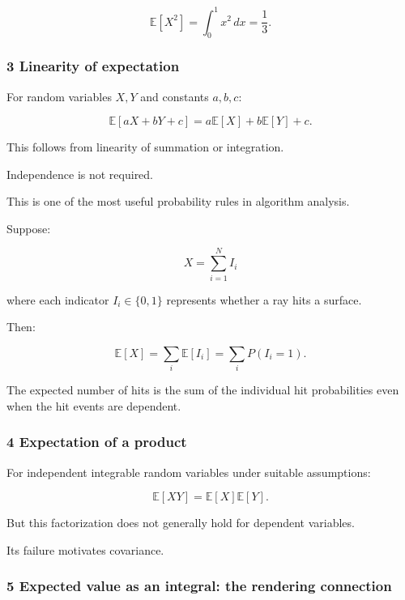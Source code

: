 \[
 \mathbb E[X^2] = \int_0^1x^2\,dx =\boxed{\frac13}.
\]

\subsubsection{3 Linearity of expectation}\label{02-foundations-ii-ch023-linearity-of-expectation}

\hypertarget{02-foundations-ii-ch023-linearity-of-expectation}{}

For random variables \(X,Y\) and constants \(a,b,c\):

\[
 \boxed{ \mathbb E[aX+bY+c] = a\mathbb E[X]+b\mathbb E[Y]+c }.
\]

This follows from linearity of summation or integration.

Independence is not required.

This is one of the most useful probability rules in algorithm analysis.

Suppose:

\[
 X=\sum_{i=1}^NI_i
\]

where each indicator \(I_i\in\{0,1\}\) represents whether a ray hits a surface.

Then:

\[
 \mathbb E[X] = \sum_i\mathbb E[I_i] = \sum_iP(I_i=1).
\]

The expected number of hits is the sum of the individual hit probabilities even when the hit events are dependent.

\subsubsection{4 Expectation of a product}\label{02-foundations-ii-ch023-expectation-of-a-product}

\hypertarget{02-foundations-ii-ch023-expectation-of-a-product}{}

For independent integrable random variables under suitable assumptions:

\[
 \boxed{ \mathbb E[XY]=\mathbb E[X]\mathbb E[Y] }.
\]

But this factorization does not generally hold for dependent variables.

Its failure motivates covariance.

\subsubsection{5 Expected value as an integral: the rendering connection}\label{02-foundations-ii-ch023-expected-value-as-an-integral-the-rendering-connection}

